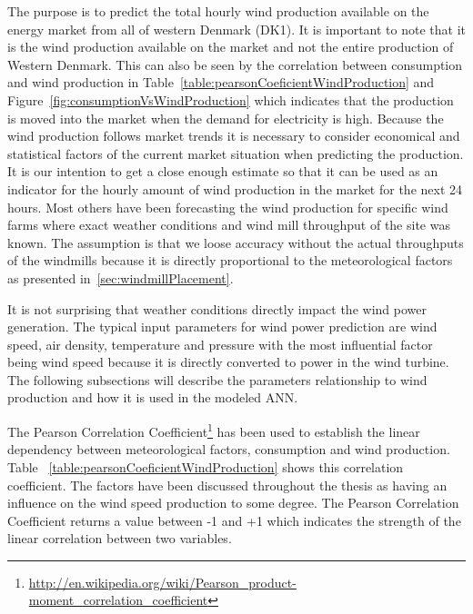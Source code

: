 The purpose is to predict the total hourly wind production available on the energy market from all of western Denmark (DK1). It is important to note that it is the wind production available on the market and not the entire production of Western Denmark. This can also be seen by the correlation between consumption and wind production in Table~\ref{table:pearsonCoeficientWindProduction} and Figure~\ref{fig:consumptionVsWindProduction} which indicates that the production is moved into the market when the demand for electricity is high. Because the wind production follows market trends it is necessary to consider economical and statistical factors of the current market situation when predicting the production. It is our intention to get a close enough estimate so that it can be used as an indicator for the hourly amount of wind production in the market for the next 24 hours.
Most others have been forecasting the wind production for specific wind farms where exact weather conditions and wind mill throughput of the site was known. The assumption is that we loose accuracy without the actual throughputs of the windmills because it is directly proportional to the meteorological factors as presented in~\ref{sec:windmillPlacement}. 

It is not surprising that weather conditions directly impact the wind power generation. The typical input parameters for wind power prediction are wind speed, air density, temperature and pressure \cite{WindPowerGenerationUsingANN} with the most influential factor being wind speed because it is directly converted to power in the wind turbine. The following subsections will describe the parameters relationship to wind production and how it is used in the modeled ANN.

The Pearson Correlation Coefficient\footnote{\url{http://en.wikipedia.org/wiki/Pearson_product-moment_correlation_coefficient}} has been used to establish the linear dependency between meteorological factors, consumption and wind production. Table ~\ref{table:pearsonCoeficientWindProduction} shows this correlation coefficient. The factors have been discussed throughout the thesis as having an influence on the wind speed production to some degree. The Pearson Correlation Coefficient returns a value between -1 and +1 which indicates the strength of the linear correlation between two variables.

